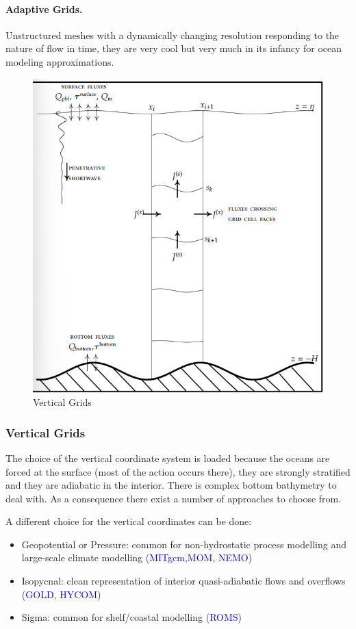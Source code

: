 \paragraph{Adaptive Grids.} Unstructured meshes with a dynamically changing resolution responding to the nature of flow in time, they are very cool but very much in its infancy for ocean modeling approximations.
\begin{figure}[h!]
	\centering
	\includegraphics[width=0.40\linewidth]{uploads/Screenshot 2024-11-21 235405.png}
	\caption{Vertical Grids}
	\label{fig:vertical grids}
\end{figure}
\subsubsection{Vertical Grids} The choice of the vertical coordinate system is loaded because the oceans are forced at the surface (most of the action occurs there), they are strongly stratified and they are adiabatic in the interior. There is complex bottom bathymetry to deal with. As a consequence there exist a number of approaches to choose from.

A different choice for the vertical coordinates can be done:
\begin{itemize}
	\item Geopotential or Pressure: common for non-hydrostatic process modelling and large-scale climate modelling (\textcolor{Blue}{MITgcm},\textcolor{Blue}{MOM}, \textcolor{Blue}{NEMO})
	\item Isopycnal:  clean representation of interior quasi-adiabatic flows and overflows (\textcolor{Blue}{GOLD}, \textcolor{Blue}{HYCOM})
	\item Sigma: common for shelf/coastal modelling (\textcolor{Blue}{ROMS})
\end{itemize}
